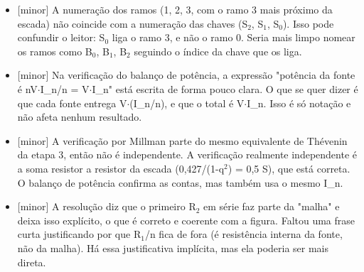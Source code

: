 \documentclass{article}%
\begin{document}
\begin{itemize}%
\item%
{[}minor{]} A numeração dos ramos (1, 2, 3, com o ramo 3 mais próximo da escada) não coincide com a numeração das chaves (S$_{2}$, S$_{1}$, S$_{0}$). Isso pode confundir o leitor: S$_{0}$ liga o ramo 3, e não o ramo 0. Seria mais limpo nomear os ramos como B$_{0}$, B$_{1}$, B$_{2}$ seguindo o índice da chave que os liga.%
\item%
{[}minor{]} Na verificação do balanço de potência, a expressão "potência da fonte é nV$\cdot$I\_n/n = V$\cdot$I\_n" está escrita de forma pouco clara. O que se quer dizer é que cada fonte entrega V$\cdot$(I\_n/n), e que o total é V$\cdot$I\_n. Isso é só notação e não afeta nenhum resultado.%
\item%
{[}minor{]} A verificação por Millman parte do mesmo equivalente de Thévenin da etapa 3, então não é independente. A verificação realmente independente é a soma resistor a resistor da escada (0,427/(1-q$^2$) = 0,5 S), que está correta. O balanço de potência confirma as contas, mas também usa o mesmo I\_n.%
\item%
{[}minor{]} A resolução diz que o primeiro R$_{2}$ em série faz parte da "malha" e deixa isso explícito, o que é correto e coerente com a figura. Faltou uma frase curta justificando por que R$_{1}$/n fica de fora (é resistência interna da fonte, não da malha). Há essa justificativa implícita, mas ela poderia ser mais direta.%
\end{itemize}%
\end{document}
